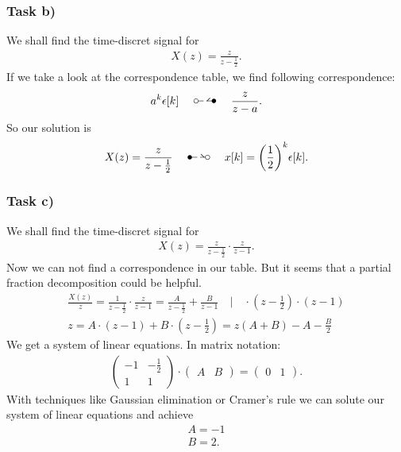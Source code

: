 \subsubsection{Task b)}
We shall find the time-discret signal for
\begin{align}
	X(z)=\frac{z}{z-\frac{1}{2}}.
\end{align}
If we take a look at the correspondence table, we find following correspondence:
\begin{align}
	\label{eq:GeometricProgression}
	a^k\epsilon[k]\quad\ztransf\quad\frac{z}{z-a}.
\end{align}
So our solution is
\begin{align}
	X(z)=\frac{z}{z-\frac{1}{2}}\quad\Ztransf\quad x[k]=\bigg (\frac{1}{2}\bigg)^k\epsilon[k].
\end{align}
\subsubsection{Task c)}
We shall find the time-discret signal for
\begin{align}
	X(z)=\frac{z}{z-\frac{1}{2}}\cdot\frac{z}{z-1}.
\end{align}
Now we can not find a correspondence in our table. But it seems that a partial fraction decomposition could be helpful.
\begin{align}
	\frac{X(z)}{z}=\frac{1}{z-\frac{1}{2}}\cdot\frac{z}{z-1}=\frac{A}{z-\frac{1}{2}}+\frac{B}{z-1} \quad \Bigg | \quad\cdot (z-\frac{1}{2})\cdot(z-1)\nonumber\\
	z=A\cdot(z-1)+B\cdot(z-\frac{1}{2})=z(A+B)-A-\frac{B}{2}
\end{align}
We get a system of linear equations. In matrix notation:
\begin{align}
	\begin{pmatrix}
		-1 & -\frac{1}{2} \\
		1 & 1
	\end{pmatrix}
	\cdot
	\begin{pmatrix}
		A & B
	\end{pmatrix}
	=
	\begin{pmatrix}
		0 & 1
	\end{pmatrix}.
\end{align}
With techniques like Gaussian elimination or Cramer's rule we can solute our system of linear equations and achieve
\begin{align}
	A = -1 \nonumber \\
	B = 2.
\end{align}


